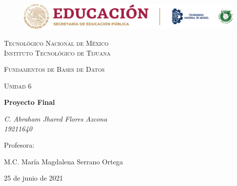 \documentclass[a4paper, 12pt]{article}
\begin{document}
    
    \begin{titlepage}
        \begin{figure}[ht]
            \centering
            \includegraphics[width=15cm]{logosITT.png}
        \end{figure}
        \centering
        {\scshape\LARGE Tecnológico Nacional de México\\Instituto Tecnológico de Tijuana\par}
        \vspace{1cm}
        {\scshape\Large Fundamentos de Bases de Datos\par}
        \vspace{1cm}
        {\scshape\Large Unidad 6\par}
        \vspace{1.5cm}
        {\huge\bfseries Proyecto Final\par}
        \vspace{2cm}
        {\Large\itshape C. Abraham Jhared Flores Azcona\\19211640\par}
        \vfill
        Profesora: \par
        M.C. María Magdalena Serrano Ortega
    
        \vfill

        {\large 25 de junio de 2021}
    \end{titlepage}

    \newpage
        \pagestyle{empty}
        \tableofcontents %
\end{document}
